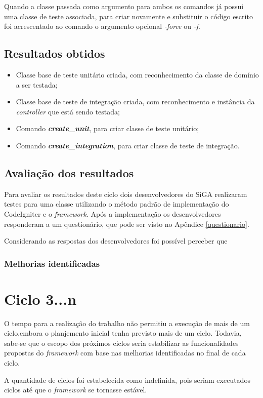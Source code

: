         Quando a classe passada como argumento para ambos os comandos já possui uma classe de teste associada, para criar novamente e substituir o código escrito foi acrescentado ao comando o argumento opcional \textit{-force} ou \textit{-f}. 

  
  \section{Resultados obtidos}
      
    \begin{itemize}

      \item Classe base de teste unitário criada, com reconhecimento da classe de domínio a ser testada;
      
      \item Classe base de teste de integração criada, com reconhecimento e instância da \textit{controller} que está sendo testada;
            
      \item Comando \textit{\textbf{create\_unit}}, para criar classe de teste unitário;

      \item Comando \textit{\textbf{create\_integration}}, para criar classe de teste de integração.

    \end{itemize}
  
  \section{Avaliação dos resultados}

    Para avaliar os resultados deste ciclo dois desenvolvedores do SiGA realizaram testes para uma classe utilizando o método padrão de implementação do CodeIgniter e o \textit{framework}. Após a implementação os desenvolvedores responderam a um questionário, que pode ser visto no Apêndice \ref{questionario}. 

    Considerando as respostas dos desenvolvedores foi possível perceber que
  
    \subsection{Melhorias identificadas}
    
\chapter{Ciclo 3...n}
  
  O tempo para a realização do trabalho não permitiu a execução de mais de um
  ciclo,embora o planjemento inicial tenha previsto mais de um ciclo. Todavia, sabe-se que o escopo dos próximos
  ciclos seria estabilizar as funcionalidades propostas do \textit{framework} com base nas melhorias identificadas
  no final de cada ciclo.
  
  A quantidade de ciclos foi estabelecida como indefinida, pois seriam executados
  ciclos até que o \textit{framework} se tornasse estável.
  